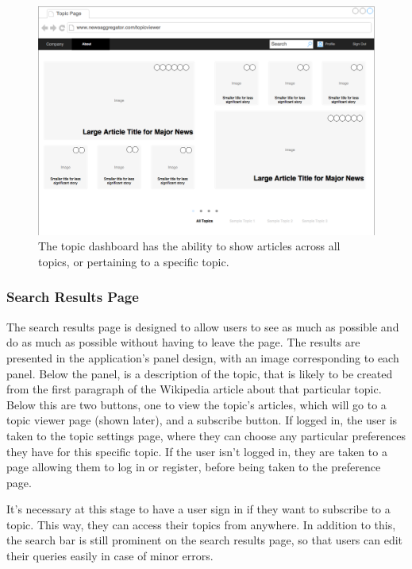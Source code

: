\documentclass[12pt]{article}
\begin{document}
\begin{figure}[ht!]
  \centering
    \includegraphics[scale=0.3]{TopicDashboard.png}
   \caption[A wireframe of the Topic Dashboard]{The topic dashboard has the ability to show articles across all topics, or pertaining to a specific topic.}
   \label{topicDashboard}
\end{figure}

\subsubsection{Search Results Page}

The search results page is designed to allow users to see as much as possible and do as much as possible without having to leave the page. The results are presented in the application's panel design, with an image corresponding to each panel. Below the panel, is a description of the topic, that is likely to be created from the first paragraph of the Wikipedia\cite{wikipedia} article about that particular topic. Below this are two buttons, one to view the topic's articles, which will go to a topic viewer page (shown later), and a subscribe button. If logged in, the user is taken to the topic settings page, where they can choose any particular preferences they have for this specific topic. If the user isn't logged in, they are taken to a page allowing them to log in or register, before being taken to the preference page.

It's necessary at this stage to have a user sign in if they want to subscribe to a topic. This way, they can access their topics from anywhere. In addition to this, the search bar is still prominent on the search results page, so that users can edit their queries easily in case of minor errors.
\end{document}
